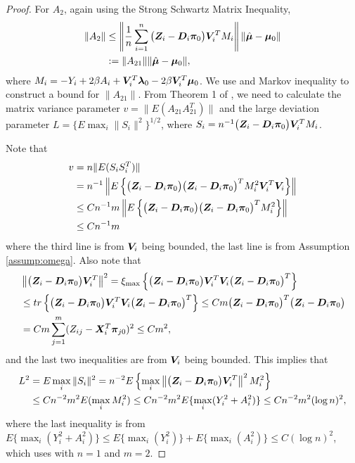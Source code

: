 \documentclass[12pt]{article}
\begin{document}
{\begin{proof}
For $ A_2 $, again using the Strong Schwartz Matrix Inequality, 
\begin{align*}
	\|A_2\| & \leq \left\|  \frac{1}{n} \sum_{i=1}^{n}\big( \bm{Z}_i-\bm D_i \bm\pi_0 \big)  \bm{V}_i^T M_i   \right\|\| \hat{\bm{\mu}} - \bm{\mu}_{0}\| \\
	&:= \|A_{21}\| \| \hat{\bm{\mu}} - \bm{\mu}_{0}\|, 
\end{align*}
where $  M_i =   - Y_i + 2\beta A_i +\bm{V}_i^T \bm{\lambda}_{0} - 2\beta \bm{V}_i^T \bm{\mu}_{0}    $. We use \citet[Theorem 1]{tropp2015expected} and Markov inequality to construct a bound for $ \|A_{21}\| $. From Theorem 1 of \cite{tropp2015expected}, we need to calculate the matrix variance parameter $ v= \| E ( A_{21} A_{21}^T )\| $ and the large deviation parameter $ L= \{ E \max_i \|S_i\|^2 \}^{1/2} $, where $  S_i = n^{-1}\big( \bm{Z}_i-\bm D_i \bm\pi_0 \big)  \bm{V}_i^T M_i $. 

 
 Note that 
 \begin{align*}
 	v& = n \| E( S_i S_i^T) \|\\
 	&=  n^{-1} \left\|  E\left\{ \big( \bm{Z}_i-\bm D_i \bm\pi_0 \big)  
 	\big( \bm{Z}_i-\bm D_i \bm\pi_0 \big)^T M_i^2  \bm{V}_i^T\bm{V}_i   \right\}   \right\| \\
 	&\leq C n^{-1} m  \left\|  E\left\{ 
 \big( \bm{Z}_i-\bm D_i \bm\pi_0 \big)  \big( \bm{Z}_i-\bm D_i \bm\pi_0 \big)^T M_i^2   \right\}   \right\|   \\
 	& \leq C n^{-1} m
 \end{align*}
 where the third line is from $ \bm{V}_i $ being bounded, the last line is from Assumption \ref{assump:omega}.  Also note that
\begin{align*}
& \left\| \big( \bm{Z}_i-\bm D_i \bm\pi_0 \big)  \bm{V}_i^T \right\|^2  = \xi_{\max} \left\{ \big( \bm{Z}_i-\bm D_i \bm\pi_0 \big)  \bm{V}_i^T  \bm{V}_i   \big( \bm{Z}_i-\bm D_i \bm\pi_0 \big) ^T \right\}\\
&\leq tr \left\{ \big( \bm{Z}_i-\bm D_i \bm\pi_0 \big)  \bm{V}_i^T  \bm{V}_i    \big( \bm{Z}_i-\bm D_i \bm\pi_0 \big) ^T \right\}  \leq Cm \big( \bm{Z}_i-\bm D_i \bm\pi_0 \big) ^T \big( \bm{Z}_i-\bm D_i \bm\pi_0 \big)  \\
&= Cm \sum_{j=1}^m (Z_{ij } - \bm{X}_i^T \bm\pi_{j0} )^2\leq Cm^2,
\end{align*}
and the last two inequalities are from $\bm{V}_i$ being bounded. This implies that 
\begin{align*}
	L^2&= E\max_i \|S_i\|^2 =n^{-2}   E\left \{ \max_i  \left\| \big( \bm{Z}_i-\bm D_i \bm\pi_0 \big)   \bm{V}_i^T \right\|^2 M_i^2 \right \} \\
	& \leq C  n^{-2} m^2 E(\max_i M_i^2) \leq C  n^{-2} m^2 E \{\max_i (Y_i^2+A_i^2) \}\leq Cn^{-2} m^2 (\log n)^2,
\end{align*}
where the last inequality is from $E \{\max_i (Y_i^2+A_i^2) \} \leq E \{\max_i (Y_i^2)\} + E\{ \max_i(A_i^2) \}   \leq C (\log n)^2$, which uses \citet[Lemma 14.12]{buhlmann2011statistics} with $n=1$ and $m=2$.



\end{proof}}
\end{document}
